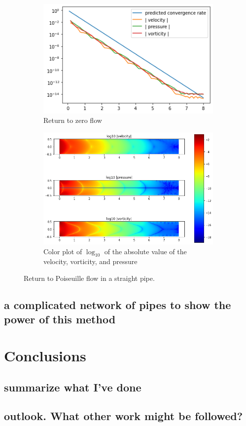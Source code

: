 \documentclass[10pt,twocolumn]{article}
\begin{document}
\begin{figure}[h!] 
  \centering
  \begin{subfigure}[b]{0.4\textwidth}
    \centering
    \includegraphics[width=\textwidth]{pic/rtp_cv.png}
    \caption{Return to zero flow}
    \label{fig:rtp_cv}
  \end{subfigure}
  \begin{subfigure}[b]{0.4\textwidth}
    \centering
    \includegraphics[width=\textwidth]{pic/rtppipe.png}
    \caption{Color plot of $\log_{10}$ of the absolute value of the velocity, vorticity, and pressure}
    \label{fig:rtppipe}
  \end{subfigure}
  \caption{Return to Poiseuille flow in a straight pipe. }
  \label{fig:r2pnumerical}
\end{figure}


\subsection{a complicated network of pipes to show the power of this method}



\section{Conclusions\label{sec:conclusions}}

\subsection{summarize what I've done}
\subsection{outlook. What other work might be followed?}


\end{document}
